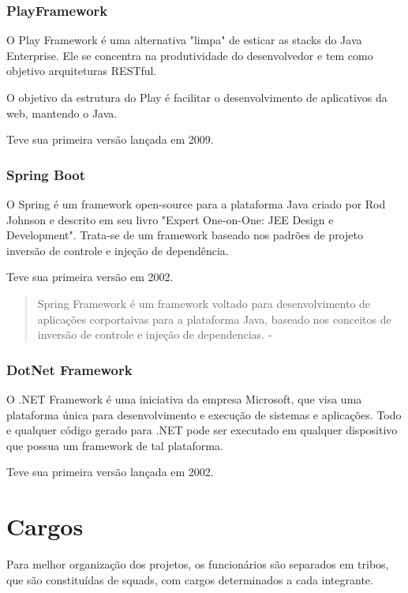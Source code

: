 \subsubsection{PlayFramework}

O Play Framework é uma alternativa "limpa" de esticar as stacks do Java Enterprise. Ele se concentra na produtividade do desenvolvedor e tem como objetivo arquiteturas RESTful. 

O objetivo da estrutura do Play é facilitar o desenvolvimento de aplicativos da web, mantendo o Java.

Teve sua primeira versão lançada em 2009.

\subsubsection{Spring Boot}

O Spring é um framework open-source para a plataforma Java criado por Rod Johnson e descrito em seu livro "Expert One-on-One: JEE Design e Development".
Trata-se de um framework baseado nos padrões de projeto inversão de controle e injeção de dependência.

Teve sua primeira versão em 2002.

\begin{quote}
  Spring Framework é um framework voltado para desenvolvimento de aplicações corportaivas para a plataforma Java, baseado nos conceitos de inversão de controle e injeção de dependencias. - \cite{weissmann2014vire}
\end{quote}

\subsubsection{DotNet Framework}

O .NET Framework é uma iniciativa da empresa Microsoft, que visa uma plataforma única para desenvolvimento e execução de sistemas e aplicações.
Todo e qualquer código gerado para .NET pode ser executado em qualquer dispositivo que possua um framework de tal plataforma.

Teve sua primeira versão lançada em 2002.

\section{Cargos}

Para melhor organização dos projetos, os funcionários são separados em tribos, que são constituídas de squads, com cargos determinados a cada integrante.

